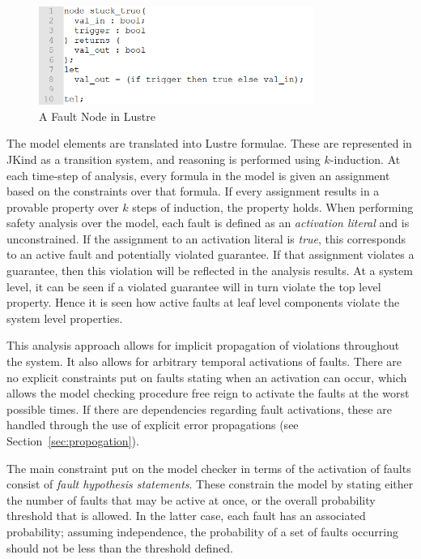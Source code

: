 \begin{figure}[h]
	\begin{center}
		\includegraphics[width=0.8\textwidth]{images/lustreFaultNode.png}
	\end{center}
	\caption{A Fault Node in Lustre}
	\label{fig:lustreFaultNode}
\end{figure}
 
The model elements are translated into Lustre formulae. These are represented in JKind as a transition system, and reasoning is performed using $k$-induction. At each time-step of analysis, every formula in the model is given an assignment based on the constraints over that formula. If every assignment results in a provable property over $k$ steps of induction, the property holds. When performing safety analysis over the model, each fault is defined as an {\em activation literal} and is unconstrained. If the assignment to an activation literal is {\em true}, this corresponds to an active fault and potentially violated guarantee. If that assignment violates a guarantee, then this violation will be reflected in the analysis results. At a system level, it can be seen if a violated guarantee will in turn violate the top level property. Hence it is seen how active faults at leaf level components violate the system level properties. 

This analysis approach allows for implicit propagation of violations throughout the system. It also allows for arbitrary temporal activations of faults. There are no explicit constraints put on faults stating when an activation can occur, which allows the model checking procedure free reign to activate the faults at the worst possible times. If there are dependencies regarding fault activations, these are handled through the use of explicit error propagations (see Section~\ref{sec:propogation}).

The main constraint put on the model checker in terms of the activation of faults consist of {\em fault hypothesis statements}. These constrain the model by stating either the number of faults that may be active at once, or the overall probability threshold that is allowed. In the latter case, each fault has an associated probability; assuming independence, the probability of a set of faults occurring should not be less than the threshold defined. 


